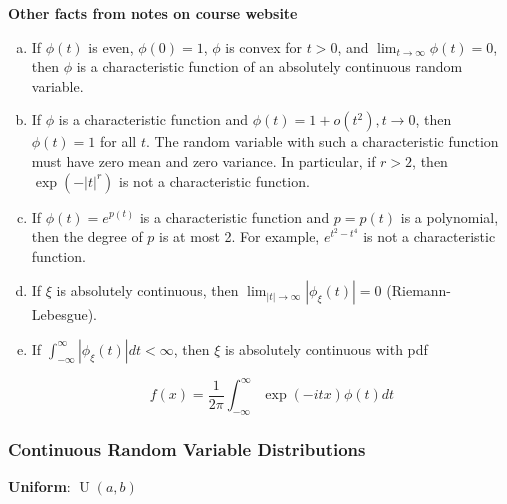\begin{theorem}

\textbf{Other facts from notes on course website}

\begin{enumerate}[(a)]

\item If \(\phi(t)\) is even, \(\phi(0) = 1\), \(\phi\) is convex for \(t > 0\), and \(\lim_{t \to \infty} \phi(t) = 0\), then \(\phi\) is a characteristic function of an absolutely continuous random variable.

\item If \(\phi\) is a characteristic function and \(\phi(t) = 1 + o(t^2), t \to 0\), then \(\phi(t) = 1\) for all \(t\). The random variable with such a characteristic function must have zero mean and zero variance. In particular, if \(r > 2\), then \(\exp(-\left|t\right|^r)\) is not a characteristic function.

\item If \(\phi(t) = e^{p(t)}\) is a characteristic function and \(p = p(t)\) is a polynomial, then the degree of \(p\) is at most 2. For example, \(e^{t^2 - t^4}\) is not a characteristic function.

\item If \(\xi\) is absolutely continuous, then \(\lim_{\left|t \right| \to \infty} \left| \phi_{\xi}(t) \right| = 0\) (Riemann-Lebesgue).

\item If \(\int_{-\infty}^\infty \left| \phi_{\xi}(t) \right| dt < \infty\), then \(\xi\) is absolutely continuous with pdf 

\[
f(x) = \frac{1}{2\pi} \int_{-\infty}^\infty \exp(-itx) \phi(t) dt
\]

\end{enumerate}
\end{theorem}

\subsubsection{Continuous Random Variable Distributions}


\textbf{Uniform}: \(\operatorname{U}(a, b)\)


